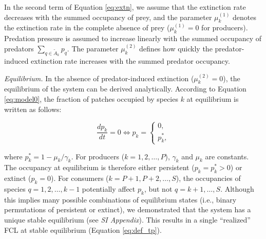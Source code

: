 \documentclass[11pt, class=article, crop=false]{standalone}
\begin{document}
In the second term of Equation \ref{eq:extn}, we assume that the extinction rate decreases with the summed occupancy of prey, and the parameter $\mu_{k}^{(1)}$ denotes the extinction rate in the complete absence of prey ($\mu_{k}^{(1)} = 0$ for producers).
Predation pressure is assumed to increase linearly with the summed occupancy of predators $\sum_{q \in \tilde{A}_{k}} p_{q}$.
The parameter $\mu_{k}^{(2)}$ defines how quickly the predator-induced extinction rate increases with the summed predator occupancy.

\textit{Equilibrium.} In the absence of predator-induced extinction ($\mu_{k}^{(2)}=0$), the equilibrium of the system can be derived analytically.
According to  Equation \ref{eq:model0}, the fraction of patches occupied by species $k$ at equilibrium is written as follows:

\begin{equation}
    \frac{dp_k}{dt} = 0 \Leftrightarrow p_k = \left\{\begin{array}{c}
         0,\\
         p_{k}^{*}, 
    \end{array}
    \right.
\end{equation}

where $p_{k}^{*} = 1 - \mu_k / \gamma_k$. 
For producers ($k=1, 2, \ldots, P$), $\gamma_k$ and $\mu_k$ are constants.
The occupancy at equilibrium is therefore either persistent ($p_k = p_k^* > 0$) or extinct ($p_k = 0$).
For consumers ($k = P+1, P+2, \ldots, S$), the occupancies of species $q = 1, 2, \ldots, k - 1$ potentially affect $p_k$, but not $q = k + 1, \ldots, S$.
Although this implies many possible combinations of equilibrium states (i.e., binary permutations of persistent or extinct), we demonstrated that the system has a unique stable equilibrium (see \textit{SI Appendix}).
This results in a single ``realized'' FCL at stable equilibrium (Equation \ref{eq:def_tp}).

\end{document}

